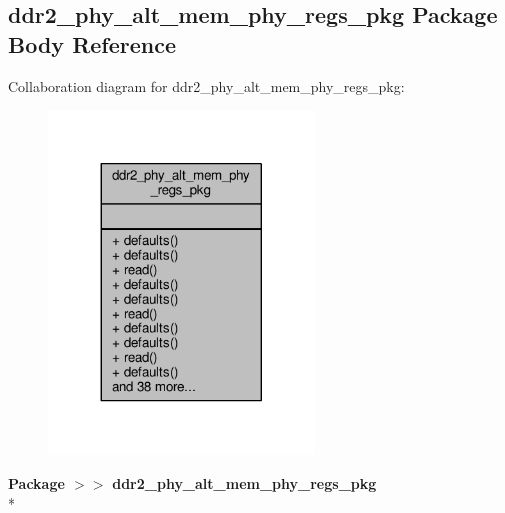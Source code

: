 \subsection{ddr2\+\_\+phy\+\_\+alt\+\_\+mem\+\_\+phy\+\_\+regs\+\_\+pkg Package Body Reference}
\label{class__ddr2__phy__alt__mem__phy__regs__pkg}


Collaboration diagram for ddr2\+\_\+phy\+\_\+alt\+\_\+mem\+\_\+phy\+\_\+regs\+\_\+pkg\+:\nopagebreak
\begin{figure}[H]
\begin{center}
\leavevmode
\includegraphics[width=200pt]{d8/d7d/class__ddr2__phy__alt__mem__phy__regs__pkg__coll__graph}
\end{center}
\end{figure}
{\bfseries Package $>$$>$ }{\bf ddr2\+\_\+phy\+\_\+alt\+\_\+mem\+\_\+phy\+\_\+regs\+\_\+pkg}\\*
